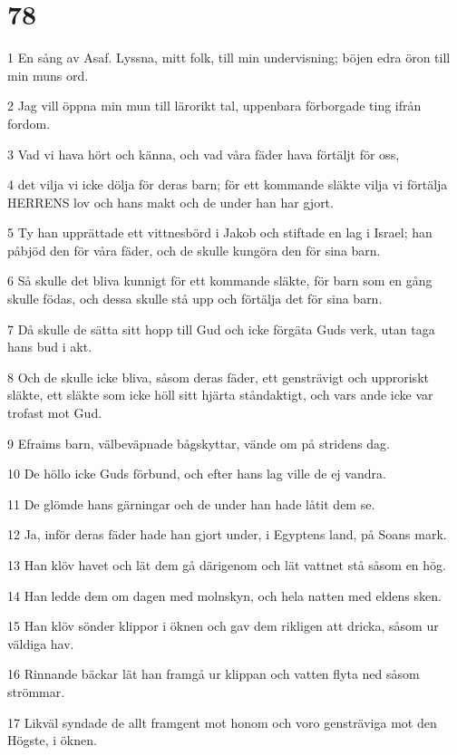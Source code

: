 \chapter{78}

\par 1 En sång av Asaf. Lyssna, mitt folk, till min undervisning; böjen edra öron till min muns ord.
\par 2 Jag vill öppna min mun till lärorikt tal, uppenbara förborgade ting ifrån fordom.
\par 3 Vad vi hava hört och känna, och vad våra fäder hava förtäljt för oss,
\par 4 det vilja vi icke dölja för deras barn; för ett kommande släkte vilja vi förtälja HERRENS lov och hans makt och de under han har gjort.
\par 5 Ty han upprättade ett vittnesbörd i Jakob och stiftade en lag i Israel; han påbjöd den för våra fäder, och de skulle kungöra den för sina barn.
\par 6 Så skulle det bliva kunnigt för ett kommande släkte, för barn som en gång skulle födas, och dessa skulle stå upp och förtälja det för sina barn.
\par 7 Då skulle de sätta sitt hopp till Gud och icke förgäta Guds verk, utan taga hans bud i akt.
\par 8 Och de skulle icke bliva, såsom deras fäder, ett gensträvigt och upproriskt släkte, ett släkte som icke höll sitt hjärta ståndaktigt, och vars ande icke var trofast mot Gud.
\par 9 Efraims barn, välbeväpnade bågskyttar, vände om på stridens dag.
\par 10 De höllo icke Guds förbund, och efter hans lag ville de ej vandra.
\par 11 De glömde hans gärningar och de under han hade låtit dem se.
\par 12 Ja, inför deras fäder hade han gjort under, i Egyptens land, på Soans mark.
\par 13 Han klöv havet och lät dem gå därigenom och lät vattnet stå såsom en hög.
\par 14 Han ledde dem om dagen med molnskyn, och hela natten med eldens sken.
\par 15 Han klöv sönder klippor i öknen och gav dem rikligen att dricka, såsom ur väldiga hav.
\par 16 Rinnande bäckar lät han framgå ur klippan och vatten flyta ned såsom strömmar.
\par 17 Likväl syndade de allt framgent mot honom och voro gensträviga mot den Högste, i öknen.
